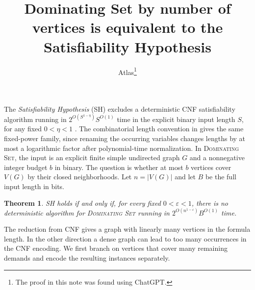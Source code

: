 \documentclass[11pt]{article}
\title{Dominating Set by number of vertices is equivalent to the Satisfiability Hypothesis}
\author{Atlas\thanks{The proof in this note was found using ChatGPT.}}
\date{}
\newtheorem{theorem}{Theorem}
\begin{document}
\maketitle

The \emph{Satisfiability Hypothesis} (SH) excludes a deterministic CNF satisfiability algorithm running in $2^{O(S^{1-\eta})}S^{O(1)}$ time in the explicit binary input length $S$, for any fixed $0<\eta<1$ \cite{sh}. The combinatorial length convention in \cite{sh} gives the same fixed-power family, since renaming the occurring variables changes lengths by at most a logarithmic factor after polynomial-time normalization. In \textsc{Dominating Set}, the input is an explicit finite simple undirected graph $G$ and a nonnegative integer budget $b$ in binary. The question is whether at most $b$ vertices cover $V(G)$ by their closed neighborhoods. Let $n=|V(G)|$ and let $B$ be the full input length in bits.

\hypertarget{dominating-set-order-sh}{}
\begin{theorem}\label{thm:ds-order-sh}
SH holds if and only if, for every fixed $0<\varepsilon<1$, there is no deterministic algorithm for \textup{\textsc{Dominating Set}} running in $2^{O(n^{1-\varepsilon})}B^{O(1)}$ time.
\end{theorem}

The reduction from CNF gives a graph with linearly many vertices in the formula length. In the other direction a dense graph can lead to too many occurrences in the CNF encoding. We first branch on vertices that cover many remaining demands and encode the resulting instances separately.
\end{document}
